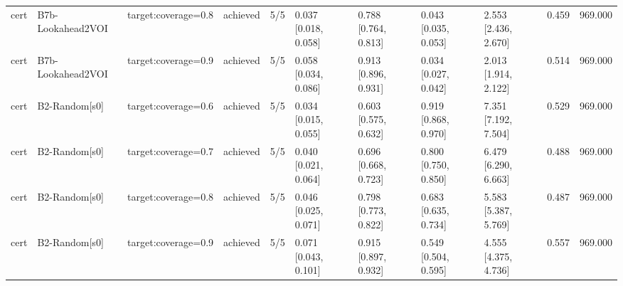 \begin{table}[!ht]
{\begin{tabular}{lllllllllll}
cert & B7b-Lookahead2VOI & target:coverage=0.8 & achieved & 5/5 & 0.037 [0.018, 0.058] & 0.788 [0.764, 0.813] & 0.043 [0.035, 0.053] & 2.553 [2.436, 2.670] & 0.459 & 969.000 \\
cert & B7b-Lookahead2VOI & target:coverage=0.9 & achieved & 5/5 & 0.058 [0.034, 0.086] & 0.913 [0.896, 0.931] & 0.034 [0.027, 0.042] & 2.013 [1.914, 2.122] & 0.514 & 969.000 \\
cert & B2-Random[s0] & target:coverage=0.6 & achieved & 5/5 & 0.034 [0.015, 0.055] & 0.603 [0.575, 0.632] & 0.919 [0.868, 0.970] & 7.351 [7.192, 7.504] & 0.529 & 969.000 \\
cert & B2-Random[s0] & target:coverage=0.7 & achieved & 5/5 & 0.040 [0.021, 0.064] & 0.696 [0.668, 0.723] & 0.800 [0.750, 0.850] & 6.479 [6.290, 6.663] & 0.488 & 969.000 \\
cert & B2-Random[s0] & target:coverage=0.8 & achieved & 5/5 & 0.046 [0.025, 0.071] & 0.798 [0.773, 0.822] & 0.683 [0.635, 0.734] & 5.583 [5.387, 5.769] & 0.487 & 969.000 \\
cert & B2-Random[s0] & target:coverage=0.9 & achieved & 5/5 & 0.071 [0.043, 0.101] & 0.915 [0.897, 0.932] & 0.549 [0.504, 0.595] & 4.555 [4.375, 4.736] & 0.557 & 969.000 \\
\bottomrule
\end{tabular}}
\end{table}
